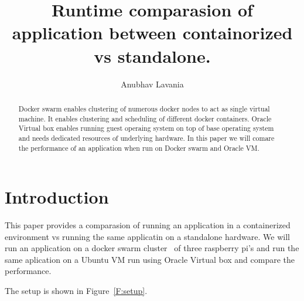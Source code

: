 
\title{Runtime comparasion of application between containorized vs standalone.}

\author{Anubhav Lavania}


\renewcommand{\shortauthors}{G. v. Laszewski}


\begin{abstract}
Docker swarm enables clustering of numerous docker nodes to act as
single virtual machine. It enables clustering and scheduling of
different docker containers. 
Oracle Virtual box enables running guest operaing system on top of
base operating system and needs dedicated resources of underlying
hardware.
In this paper we will comare the performance of an application when
run on Docker swarm and Oracle VM.

\end{abstract}



\maketitle


\section{Introduction}

This paper provides a comparasion of running an application in a
containerized environment vs running the same applicatin on a
standalone hardware. We will run an application on a docker swarm
cluster~\cite{hid-sp18-413-dockerswarm} of three raspberry pi's and
run the same aplication on a Ubuntu VM run using Oracle Virtual box and compare the performance.

The setup is shown in Figure~\ref{F:setup}.

